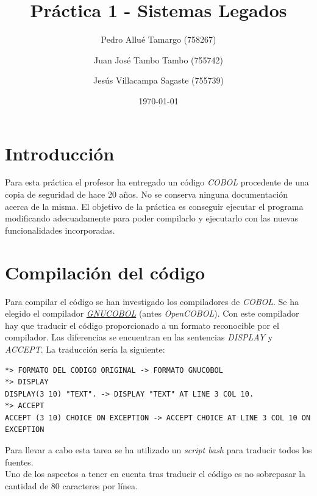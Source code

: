 \documentclass[10pt,a4paper]{article}
\begin{document}
\begin{titlepage}
\title{\textbf{{\Huge Práctica 1 - Sistemas Legados}}}
\author{
	Pedro Allué Tamargo (758267)
	\and
	Juan José Tambo Tambo (755742)
	\and
	Jesús Villacampa Sagaste (755739)
}
\date{\today}
\clearpage\maketitle
\thispagestyle{empty}
\tableofcontents
\listoffigures
\end{titlepage}

\section{Introducción}

Para esta práctica el profesor ha entregado un código \emph{COBOL} procedente de una copia de seguridad de hace 20 años. No se conserva ninguna documentación acerca de la misma. El objetivo de la práctica es conseguir ejecutar el programa modificando adecuadamente para poder compilarlo y ejecutarlo con las nuevas funcionalidades incorporadas.

\section{Compilación del código}

Para compilar el código se han investigado los compiladores de \emph{COBOL}. Se ha elegido el compilador \href{https://sourceforge.net/projects/gnucobol/}{\emph{GNUCOBOL}} (antes \emph{OpenCOBOL}). Con este compilador hay que traducir el código proporcionado a un formato reconocible por el compilador. Las diferencias se encuentran en las sentencias \emph{DISPLAY} y \emph{ACCEPT}. La traducción sería la siguiente:

\begin{lstlisting}
*> FORMATO DEL CODIGO ORIGINAL -> FORMATO GNUCOBOL
*> DISPLAY
DISPLAY(3 10) "TEXT". -> DISPLAY "TEXT" AT LINE 3 COL 10.
*> ACCEPT 
ACCEPT (3 10) CHOICE ON EXCEPTION -> ACCEPT CHOICE AT LINE 3 COL 10 ON EXCEPTION
\end{lstlisting}

Para llevar a cabo esta tarea se ha utilizado un \emph{script bash} para traducir todos los fuentes.\\

Uno de los aspectos a tener en cuenta tras traducir el código es no sobrepasar la cantidad de 80 caracteres por línea.\\
\end{document}
